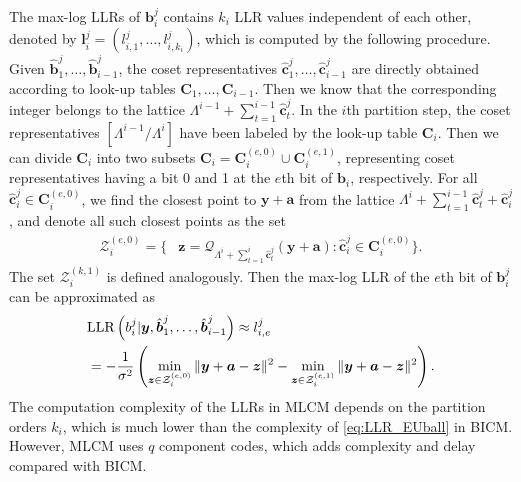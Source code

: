 \documentclass[journal]{IEEEtran}
\newcommand{\Q}{\mathcal{Q}}
\newcommand{\ba}{\boldsymbol{a}}
\newcommand{\bb}{\boldsymbol{b}}
\newcommand{\bc}{\boldsymbol{c}}
\newcommand{\bl}{\boldsymbol{l}}
\newcommand{\by}{\boldsymbol{y}}
\newcommand{\bz}{\boldsymbol{z}}
\newcommand{\bC}{\boldsymbol{C}}
\begin{document}
The max-log LLRs of $\bb_i^j$ contains $k_i$ LLR values independent of each other, denoted by $\bl_i^j=(l_{i,1}^j,\dots,l_{i,k_i}^j)$, which is computed by the following procedure. Given $\hat{\bb}_1^j,\dots,\hat{\bb}_{i-1}^j$, the coset representatives $\hat{\bc}_1^j,\dots,\hat{\bc}_{i-1}^j$ are directly obtained according to look-up tables $\bC_{1},\dots,\bC_{i-1}$. Then we know that the corresponding integer belongs to the lattice $\Lambda^{i-1}+\sum_{t=1}^{i-1}\hat{\bc}_t^j$. In the $i$th partition step, the coset representatives $[\Lambda^{i-1}/\Lambda^i]$ have been labeled by the look-up table $\bC_i$. Then we can divide $\bC_i$ into two subsets $\bC_i=\bC_i^{(e,0)}\cup\bC_i^{(e,1)}$, representing coset representatives having a bit 0 and 1 at the $e$th bit of $\bb_i$, respectively. For all $\hat{\bc}_i^j\in\bC_i^{(e,0)}$, we find the closest point to $\by+\ba$ from the lattice $\Lambda^i+\sum_{t=1}^{i-1}\hat{\bc}_t^j+\hat{\bc}_i^j$, and denote all such closest points as the set
\begin{align}
    \mathcal{Z}_i^{(e,0)}=\{&\bz=\Q_{\Lambda^i+\sum_{t=1}^{i}\hat{\bc}_t^j}(\by+\ba):\hat{\bc}_i^j \in \bC_i^{(e,0)}\}.
\end{align}
The set $\mathcal{Z}_i^{(k,1)}$ is defined analogously. Then the max-log LLR of the $e$th bit of $\bb_i^j$ can be approximated as 
\begin{align}
    &\text{LLR}\left(b_i^j|\by, \hat{\bb}_1^j,\dots,\hat{\bb}_{i-1}^j\right)\approx l_{i,e}^j\notag\\
    &=-\frac{1}{\sigma^2}\left (\min_{\bz\in\mathcal{Z}_i^{(e,0)}}\|\by+\ba-\bz\|^2- \min_{\bz\in\mathcal{Z}_i^{(e,1)}}\|\by+\ba-\bz\|^2\right).\label{eq:LLR_MLC}
\end{align}
The computation complexity of the LLRs in MLCM depends on the partition orders $k_i$, which is much lower than the complexity of \eqref{eq:LLR_EUball} in BICM. However, MLCM uses $q$ component codes, which adds complexity and delay compared with BICM.
\end{document}
